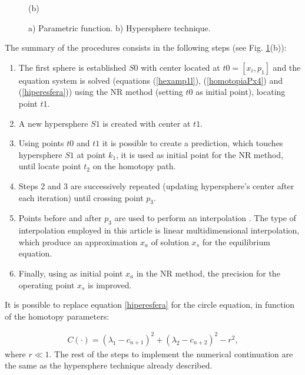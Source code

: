 \documentclass[conference,letterpaper,onecolumn]{IEEEtran}
\begin{document}
\begin{figure}[hbtp]
\begin{minipage}{\linewidth}
\end{minipage}
\newline
\begin{minipage}{\linewidth}
\centering
(b) 
\end{minipage}
\newline
\caption{a) Parametric function. b) Hypersphere technique.}
\label{curvasl}
\end{figure}

The summary of the procedures consists in the following steps \cite{hiper} (see Fig. \ref{curvasl}(b)):

\begin{enumerate}
\item The first sphere is established $S0$ with center located at $t0=[x_i,p_1]$ and the equation system is solved (equations (\ref{hexamp1l}), (\ref{homotopiaPx4}) and (\ref{hiperesfera})) using the NR method (setting $t0$ as initial point), locating point $t1$.
\item A new hypersphere $S1$ is created with center at $t1$.
\item Using points $t0$ and $t1$ it is possible to create a prediction, which touches hypersphere $S1$ at point $k_1$, it is used as initial point for the NR method, until locate point $t_2$ on the homotopy path.
\item Steps 2 and 3 are successively repeated (updating hypersphere's center after  each iteration) until crossing point $p_3$.
\item Points before and after $p_3$ are used to perform an interpolation \cite{homo_sosonkina}. The type of interpolation employed in this article is linear multidimensional interpolation, which produce an approximation $x_{a}$ of solution $x_s$ for the equilibrium equation.
\item Finally, using as initial point $x_a$ in the NR method, the precision for the operating point $x_s$ is improved.
\end{enumerate}

It is possible to replace equation \ref{hiperesfera} for the circle equation, in function of the homotopy parameters:

{
\begin{equation}
\begin{array}{c}
C(\cdot)=(\lambda_1-c_{n+1})^2+(\lambda_2-c_{n+2})^2-r^2,
\end{array}
\label{hiperesfera1}
\end{equation}}
where $r\ll 1$. The rest of the steps to implement the numerical continuation are the same as the hypersphere technique already described.
\end{document}
